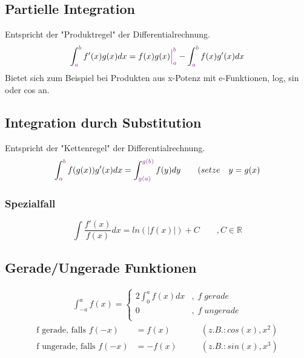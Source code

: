 \documentclass[12pt,a4paper]{article}%
\numberwithin{equation}{section}
\newcommand{\R}{\mathbb{R}} %
\def\colBord#1{\begingroup\color{Fuchsia}{#1}\endgroup}
\begin{document}
\subsection{Partielle Integration}
Entspricht der "Produktregel" der Differentialrechnung.
\begin{equation}
\int_{\colBord{a}}^{\colBord{b}} f'(x) g(x) dx = f(x) g(x) \colBord{\Big|_a^b} - \int_{\colBord{a}}^{\colBord{b}} f(x) g'(x) dx \label{eq:rule_partInt}
\end{equation}
Bietet sich zum Beispiel bei Produkten aus x-Potenz mit e-Funktionen, log, sin oder cos an.

\subsection{Integration durch Substitution}
Entspricht der "Kettenregel" der Differentialrechnung.
\begin{equation}
\int_{\colBord{a}}^{\colBord{b}} f(g(x))g'(x) dx = \int_{\colBord{g(a)}}^{\colBord{g(b)}} f(y) dy \qquad (setze \quad y = g(x) \label{eq:rule_subs}
\end{equation}

\subsubsection{Spezialfall}
\begin{equation}
\int \frac{f'(x)}{f(x)} dx = ln(|f(x)|) + C \qquad ,C\in\R \label{eq:rule_spec}
\end{equation}

\newpage

\subsection{Gerade/Ungerade Funktionen}
\begin{align}
\int_{-a}^a f(x) = 
\begin{cases}
2 \int_0^a f(x) dx &,\; f\; gerade\\
0 &,\; f\; ungerade\\
\end{cases} \label{eq:evenodd}
\end{align}
\begin{align*}
\text{f gerade, falls }f(-x) &= f(x) \qquad &(z.B.: cos(x), x^2)\\
\text{f ungerade, falls }f(-x) &= -f(x) \qquad &(z.B.: sin(x), x^3)\\
\end{align*}
\end{document}
